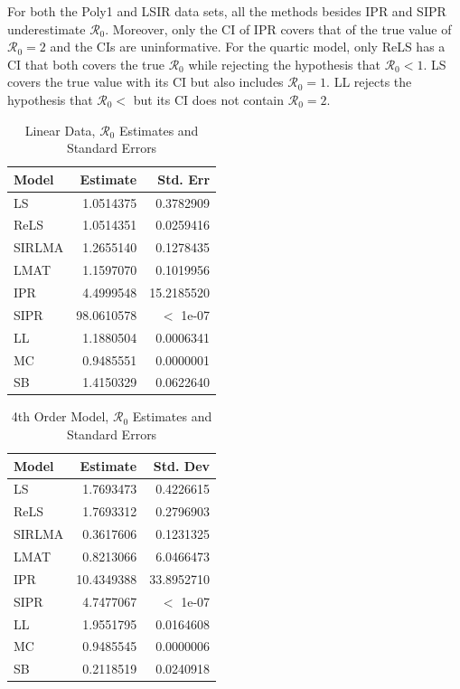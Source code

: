 \documentclass[12pt]{article}
\newcommand{\rr}{\ensuremath{\mathcal{R}_0}}
\begin{document}
For both the Poly1 and LSIR data sets, all the methods besides IPR and SIPR underestimate $\rr$.  Moreover, only the CI of IPR covers that of the true value of $\rr=2$ and the CIs are uninformative.  For the quartic model, only ReLS has a CI that both covers the true $\rr$ while rejecting the hypothesis that $\rr < 1$.  LS covers the true value with its CI but also includes $\rr=1$.  LL rejects the hypothesis that $\rr <$ but its CI does not contain $\rr=2$.

\begin{table}[H]

	\centering
	\begin{tabular}[t]{l|r|r}
		\hline
		Model & Estimate & Std. Err\\
		\hline
		LS & 1.0514375 & 0.3782909\\
		\hline
		ReLS & 1.0514351 & 0.0259416\\
		\hline
		SIRLMA & 1.2655140 & 0.1278435\\
		\hline
		LMAT & 1.1597070 & 0.1019956\\
		\hline
		IPR & 4.4999548 & 15.2185520\\
		\hline
		SIPR & 98.0610578 & $<$ 1e-07\\
		\hline
		LL & 1.1880504 & 0.0006341\\
		\hline
		MC & 0.9485551 & 0.0000001\\
		\hline
		SB & 1.4150329 & 0.0622640\\
		\hline
	\end{tabular}
	\caption{Linear Data, $\rr$ Estimates and Standard Errors}\label{tab:other-res1}
\end{table}

\begin{table}[H]


\centering
\begin{tabular}[t]{l|r|r}
	\hline
	Model & Estimate & Std. Dev\\
	\hline
	LS & 1.7693473 & 0.4226615\\
	\hline
	ReLS & 1.7693312 & 0.2796903\\
	\hline
	SIRLMA & 0.3617606 & 0.1231325\\
	\hline
	LMAT & 0.8213066 & 6.0466473\\
	\hline
	IPR & 10.4349388 & 33.8952710\\
	\hline
	SIPR & 4.7477067 &  $<$ 1e-07\\
	\hline
	LL & 1.9551795 & 0.0164608\\
	\hline
	MC & 0.9485545 & 0.0000006\\
	\hline
	SB & 0.2118519 & 0.0240918\\
	\hline
\end{tabular}
\caption{4th Order Model, $\rr$ Estimates and Standard Errors}\label{tab:other-res2} 
\end{table}
\end{document}
